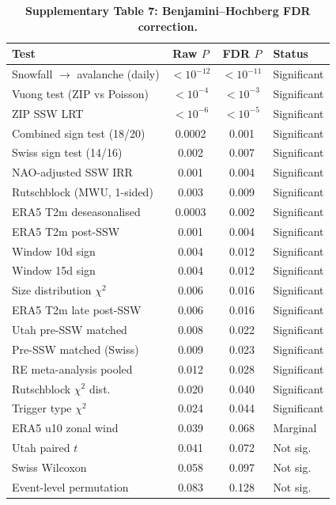 \documentclass[11pt,letterpaper]{article}
\begin{document}
\begin{table}[!ht]
\centering
\caption{\textbf{Supplementary Table 7: Benjamini--Hochberg FDR correction.}}
\label{stab:fdr}
\small
\begin{tabular}{lccl}
\toprule
Test & Raw $P$ & FDR $P$ & Status \\
\midrule
Snowfall $\to$ avalanche (daily) & $<10^{-12}$ & $<10^{-11}$ & Significant \\
Vuong test (ZIP vs Poisson) & $<10^{-4}$ & $<10^{-3}$ & Significant \\
ZIP SSW LRT & $<10^{-6}$ & $<10^{-5}$ & Significant \\
Combined sign test (18/20) & 0.0002 & 0.001 & Significant \\
Swiss sign test (14/16) & 0.002 & 0.007 & Significant \\
NAO-adjusted SSW IRR & 0.001 & 0.004 & Significant \\
Rutschblock (MWU, 1-sided) & 0.003 & 0.009 & Significant \\
ERA5 T2m deseasonalised & 0.0003 & 0.002 & Significant \\
ERA5 T2m post-SSW & 0.001 & 0.004 & Significant \\
Window 10d sign & 0.004 & 0.012 & Significant \\
Window 15d sign & 0.004 & 0.012 & Significant \\
Size distribution $\chi^2$ & 0.006 & 0.016 & Significant \\
ERA5 T2m late post-SSW & 0.006 & 0.016 & Significant \\
Utah pre-SSW matched & 0.008 & 0.022 & Significant \\
Pre-SSW matched (Swiss) & 0.009 & 0.023 & Significant \\
RE meta-analysis pooled & 0.012 & 0.028 & Significant \\
Rutschblock $\chi^2$ dist. & 0.020 & 0.040 & Significant \\
Trigger type $\chi^2$ & 0.024 & 0.044 & Significant \\
ERA5 u10 zonal wind & 0.039 & 0.068 & Marginal \\
Utah paired $t$ & 0.041 & 0.072 & Not sig. \\
Swiss Wilcoxon & 0.058 & 0.097 & Not sig. \\
Event-level permutation & 0.083 & 0.128 & Not sig. \\
\bottomrule
\end{tabular}
\end{table}
\end{document}
